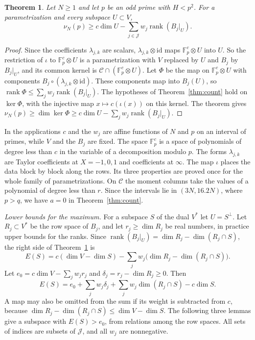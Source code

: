 \documentclass[11pt]{amsart}
\newtheorem{theorem}{Theorem}[section]
\theoremstyle{definition}
\theoremstyle{remark}
\numberwithin{equation}{section}
\newcommand{\F}{\mathbb F}
\newcommand{\rank}{\operatorname{rank}}
\begin{document}
\begin{theorem}\label{thm:everyU}
Let $N\ge1$ and let $p$ be an odd prime with $H<p^2$. For a parametrization and every subspace $U\subset V$,
\[
 \nu_N(p)\ge c\dim U-\sum_{j\in\mathcal J}w_j\rank(B_j|_U).
\]
\end{theorem}

\begin{proof}
Since the coefficients $\lambda_{j,k}$ are scalars, $\lambda_{j,k}\otimes\mathrm{id}$ maps $\F_p^c\otimes U$ into $U$. So the restriction of $\iota$ to $\F_p^c\otimes U$ is
a parametrization with $V$ replaced by $U$ and $B_j$ by $B_j|_U$, and its common kernel is $\mathcal C\cap(\F_p^c\otimes U)$. Let $\Phi$ be the map on $\F_p^c\otimes U$ with
components $B_j\circ(\lambda_{j,k}\otimes\mathrm{id})$. These components map into $B_j(U)$, so $\rank\Phi\le\sum_jw_j\rank(B_j|_U)$. The
hypotheses of Theorem~\ref{thm:count} hold on $\ker\Phi$, with the injective map $x\mapsto c(\iota(x))$ on this kernel. The theorem gives
$\nu_N(p)\ge\dim\ker\Phi\ge c\dim U-\sum_jw_j\rank(B_j|_U)$.
\end{proof}

In the applications $c$ and the $w_j$ are affine functions of $N$ and $p$ on an interval of primes, while $V$ and
the $B_j$ are fixed. The space $\F_p^c$ is a space of polynomials of degree less than $c$ in the variable of a
decomposition modulo $p$. The forms $\lambda_{j,k}$ are Taylor coefficients at $X=-1,0,1$ and coefficients at $\infty$. The map $\iota$ places the data block by block along the rows. Its three properties are proved once for the whole family of parametrizations. On $\mathcal C$ the moment columns take the
values of a polynomial of degree less than $r$. Since the intervals lie in $(3N,16.2N)$, where $p>q$, we have $a=0$ in
Theorem~\ref{thm:count}.

\emph{Lower bounds for the maximum.} For a subspace $S$ of the dual $V^*$ let $U=S^\perp$. Let $R_j\subset V^*$ be the row space of $B_j$, and let $r_j\ge\dim R_j$ be real
numbers, in practice upper bounds for the ranks. Since $\rank(B_j|_U)=\dim R_j-\dim(R_j\cap S)$, the right side of Theorem~\ref{thm:everyU} is
\[
 E(S)=c(\dim V-\dim S)-\sum_jw_j\bigl(\dim R_j-\dim(R_j\cap S)\bigr).
\]
Let $e_0=c\dim V-\sum_jw_jr_j$ and $\delta_j=r_j-\dim R_j\ge0$. Then
\begin{equation}\label{eq:eulerid}
 E(S)=e_0+\sum_jw_j\delta_j+\sum_jw_j\dim(R_j\cap S)-c\dim S .
\end{equation}
A map may also be omitted from the sum if its weight is subtracted from $c$, because $\dim R_j-\dim(R_j\cap S)\le\dim V-\dim S$. The following three lemmas give a subspace
with $E(S)>e_0$, from relations among the row spaces. All sets of indices are subsets of $\mathcal J$, and all $w_j$ are nonnegative.
\end{document}

